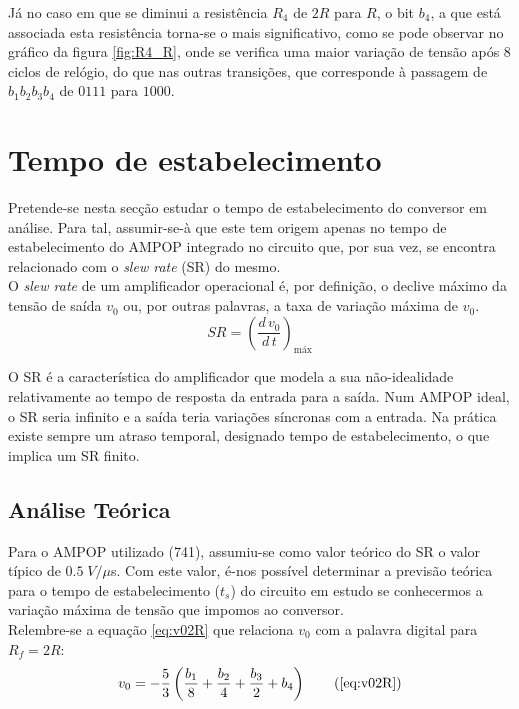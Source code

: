 \documentclass[a4paper,11pt]{report}
\begin{document}
Já no caso em que se diminui a resistência $R_4$ de $2R$ para $R$, o bit $b_4$, a que está associada esta resistência torna-se o mais significativo, como se pode observar no gráfico da figura \ref{fig:R4_R}, onde se verifica uma maior variação de tensão após 8 ciclos de relógio, do que nas outras transições, que corresponde à passagem de $b_1b_2b_3b_4$ de $0111$ para $1000$.

\chapter{Tempo de estabelecimento}
Pretende-se nesta secção estudar o tempo de estabelecimento do conversor em análise. Para tal, assumir-se-à que este tem origem apenas no tempo de estabelecimento do AMPOP integrado no circuito que, por sua vez, se encontra relacionado com o \emph{slew rate} (SR) do mesmo.\\
O \emph{slew rate} de um amplificador operacional é, por definição, o declive máximo da tensão de saída $v_0$ ou, por outras palavras, a taxa de variação máxima de $v_0$.
\begin{equation}
SR=\left(\dfrac{d\, v_0}{d\, t}\right)_{\textrm{máx}}
\end{equation}

O SR é a característica do amplificador que modela a sua não-idealidade relativamente ao tempo de resposta da entrada para a saída. Num AMPOP ideal, o SR seria infinito e a saída teria variações síncronas com a entrada. Na prática existe sempre um atraso temporal, designado tempo de estabelecimento, o que implica um SR finito.

\section{Análise Teórica}

Para o AMPOP utilizado (741), assumiu-se como valor teórico do SR o valor típico de $0.5\;V/\mu$s. Com este valor, é-nos possível determinar a previsão teórica para o tempo de estabelecimento ($t_s$) do circuito em estudo se conhecermos a variação máxima de tensão que impomos ao conversor.\\

Relembre-se a equação \ref{eq:v02R} que relaciona $v_0$ com a palavra digital para $R_f=2R$:
\begin{equation}
v_0=-\frac{5}{3}\left(\frac{b_1}{8}+\frac{b_2}{4}+\frac{b_3}{2}+b_4\right)\tag{\ref{eq:v02R}}
\end{equation}
\end{document}
